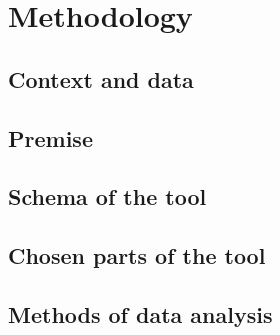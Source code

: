 \chapter{Methodology}\label{r:background}

\section{Context and data}




\section{Premise}

\section{Schema of the tool}

\section{Chosen parts of the tool}

\section{Methods of data analysis}
